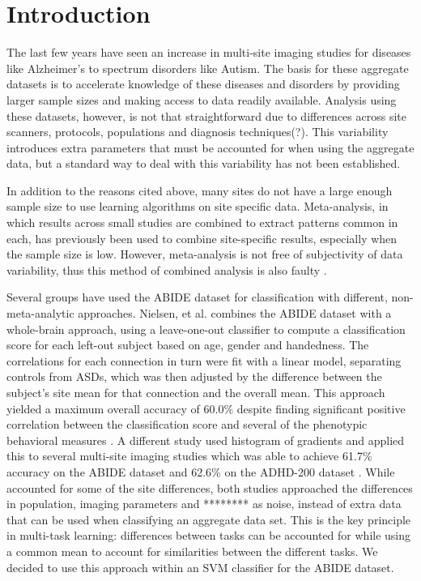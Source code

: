 \documentclass{llncs}
\begin{document}
\section{Introduction}
The last few years have seen an increase in multi-site imaging studies for diseases like Alzheimer's to spectrum disorders like Autism. The basis for these aggregate datasets is to accelerate knowledge of these diseases and disorders by providing larger sample sizes and making access to data readily available.  Analysis using these datasets, however, is not that straightforward due to differences across site scanners, protocols, populations and diagnosis techniques(?). This variability introduces extra parameters that must be accounted for when using the aggregate data, but a standard way to deal with this variability has not been established.

In addition to the reasons cited above, many sites do not have a large enough sample size to use learning algorithms on site specific data.
Meta-analysis, in which results across small studies are combined to extract patterns common in each, has previously been used to combine site-specific results, especially when the sample size is low.  However, meta-analysis is not free of subjectivity of data variability, thus this method of combined analysis is also faulty \cite{meta}.

Several groups have used the ABIDE dataset for classification with different, non-meta-analytic approaches. Nielsen, et al. combines the ABIDE dataset with a whole-brain approach, using a leave-one-out classifier to compute a classification score for each left-out subject based on age, gender and handedness.  The correlations for each connection in turn were fit with a linear model, separating controls from ASDs, which was then adjusted by the difference between the subject's site mean for that connection and the overall mean.  This approach yielded a maximum overall accuracy of 60.0\% despite finding significant positive correlation between the classification score and several of the phenotypic behavioral measures \cite{Jared}. A different study used histogram of gradients and applied this to several multi-site imaging studies which was able to achieve 61.7\% accuracy on the ABIDE dataset and 62.6\% on the ADHD-200 dataset \cite{ghiassian}. While \cite{Jared} accounted for some of the site differences, both studies approached the differences in population, imaging parameters and ******** as noise, instead of extra data that can be used when classifying an aggregate data set.
This is the key principle in multi-task learning: differences between tasks can be accounted for while using a common mean to account for similarities between the different tasks.  We decided to use this approach within an SVM classifier for the ABIDE dataset.
\end{document}
